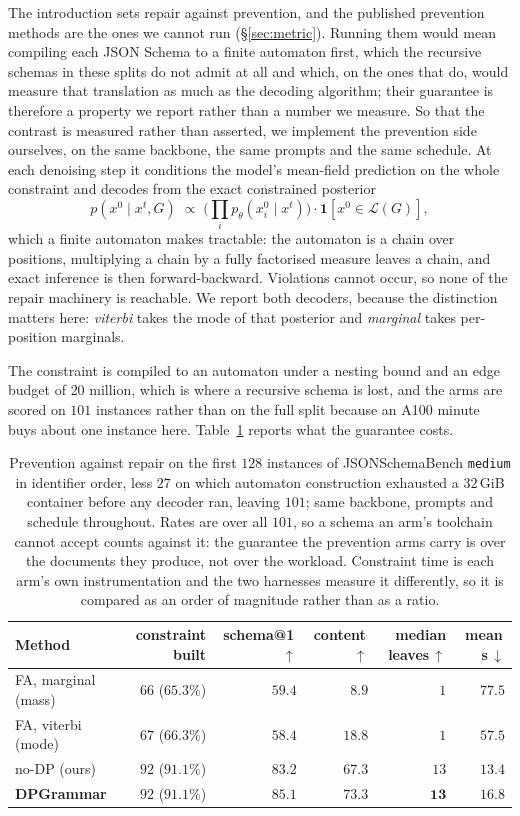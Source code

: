 The introduction sets repair against prevention, and the published prevention
methods are the ones we cannot run (\S\ref{sec:metric}). Running them would mean
compiling each JSON Schema to a finite automaton first, which the recursive
schemas in these splits do not admit at all and which, on the ones that do,
would measure that translation as much as the decoding algorithm; their
guarantee is therefore a property we report rather than a number we measure. So
that the contrast is measured rather than asserted, we implement the prevention
side ourselves, on the same backbone, the same prompts and the same schedule. At each
denoising step it conditions the model's mean-field prediction on the whole
constraint and decodes from the exact constrained posterior
\[
p(x^0 \mid x^t, G)\;\propto\;\Big(\textstyle\prod_i p_\theta(x^0_i \mid x^t)\Big)\cdot
\mathbf{1}\!\left[x^0 \in \mathcal{L}(G)\right],
\]
which a finite automaton makes tractable: the automaton is a chain over
positions, multiplying a chain by a fully factorised measure leaves a chain, and
exact inference is then forward-backward. Violations cannot occur, so none of
the repair machinery is reachable. We report both decoders, because the
distinction matters here: \emph{viterbi} takes the mode of that posterior and
\emph{marginal} takes per-position marginals.

The constraint is compiled to an automaton under a nesting bound and an edge
budget of $20$ million, which is where a recursive schema is lost, and the arms
are scored on $101$ instances rather than on the full split because an A100
minute buys about one instance here. Table~\ref{tab:prevention} reports what the
guarantee costs.

\begin{table}[h]
\centering
\small
\caption{Prevention against repair on the first $128$ instances of
JSONSchemaBench \texttt{medium} in identifier order, less $27$ on which
automaton construction exhausted a $32$\,GiB container before any decoder ran,
leaving $101$; same backbone, prompts and schedule throughout. Rates are over all
$101$, so a schema an arm's toolchain cannot accept counts against it: the
guarantee the prevention arms carry is over the documents they produce, not over
the workload. Constraint time is each arm's own instrumentation and the two
harnesses measure it differently, so it is compared as an order of magnitude
rather than as a ratio.}
\label{tab:prevention}
\begin{tabular}{lrrrrr}
\toprule
Method & constraint built & schema@1\,$\uparrow$ & content\,$\uparrow$ & median leaves\,$\uparrow$ & mean\,s\,$\downarrow$ \\
\midrule
FA, marginal (mass) & $66$ ($65.3\%$) & $59.4$ & $8.9$  & $1$  & $77.5$ \\
FA, viterbi (mode)  & $67$ ($66.3\%$) & $58.4$ & $18.8$ & $1$  & $57.5$ \\
no-DP (ours)        & $92$ ($91.1\%$) & $83.2$ & $67.3$ & $13$ & $\mathbf{13.4}$ \\
\textbf{DPGrammar}  & $92$ ($91.1\%$) & $\mathbf{85.1}$ & $\mathbf{73.3}$ & $\mathbf{13}$ & $16.8$ \\
\bottomrule
\end{tabular}
\end{table}

